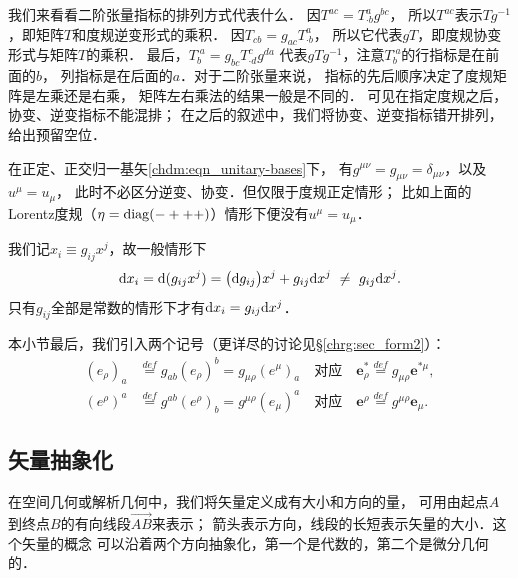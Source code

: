 我们来看看二阶张量指标的排列方式代表什么．
因$T^{ac}=T^{a}_{\cdot b}g^{bc}$，
所以$T^{ac}$表示$Tg^{-1}$，即矩阵$T$和度规逆变形式的乘积．
因$T_{cb}=g_{ac}T^{a}_{\cdot b}$，
所以它代表$g T$，即度规协变形式与矩阵$T$的乘积．
最后，$T^{\cdot a}_{b}=g_{bc}T^{c}_{\cdot d}g^{da}$
代表$g T g^{-1}$，注意$T^{\cdot a}_{b}$的行指标是在前面的$b$，
列指标是在后面的$a$．对于二阶张量来说，
指标的先后顺序决定了度规矩阵是左乘还是右乘，
矩阵左右乘法的结果一般是不同的．
可见在指定度规之后，协变、逆变指标不能混排；
在之后的叙述中，我们将协变、逆变指标错开排列，给出预留空位．

在{\kaishu 正定、正交归一}基矢\eqref{chdm:eqn_unitary-bases}下，
有$g^{\mu\nu}=g_{\mu\nu}=\delta_{\mu\nu}$，以及$u^\mu = u_\mu$，
此时不必区分逆变、协变．但仅限于度规正定情形；
比如上面的Lorentz度规（$\eta={\rm diag}(-+++)$）情形下便没有$u^\mu = u_\mu$．

我们记$x_i \equiv g_{ij}x^j$，故一般情形下
\begin{align}
	{\rm d}x_i = {\rm d}(g_{ij}x^j) = \bigl({\rm d}g_{ij}\bigr)x^j+ g_{ij}{\rm d}x^j
	\  \neq \ g_{ij}{\rm d}x^j.
\end{align}
只有$g_{ij}$全部是常数的情形下才有${\rm d}x_i =g_{ij}{\rm d}x^j$．


本小节最后，我们引入两个记号（更详尽的讨论见\S\ref{chrg:sec_form2}）：
\begin{subequations}\label{chdm:eqn_eiud}
	\begin{align}
		(e_\rho)_a &\overset{def}{=} g_{ab}(e_\rho)^b 
		= g_{\mu\rho}(e^\mu)_a
		\quad \text{对应}\quad 
		\boldsymbol{e}_\rho ^* \overset{def}{=} g_{\mu\rho} \boldsymbol{e}^{*\mu}, \\
		(e^\rho)^a &\overset{def}{=} g^{ab}(e^\rho)_b 
		= g^{\mu\rho}(e_\mu)^a 
		\quad \text{对应}\quad 
		\boldsymbol{e}^\rho \overset{def}{=} g^{\mu\rho} \boldsymbol{e}_{\mu} .
	\end{align}
\end{subequations}






\subsection{矢量抽象化}\label{chdm:sec_vector-abstract2geo}
在空间几何或解析几何中，我们将矢量定义成有大小和方向的量，
可用由起点$A$到终点$B$的有向线段$\overrightarrow{AB}$来表示；
箭头表示方向，线段的长短表示矢量的大小．这个矢量的概念
可以沿着两个方向{\kaishu 抽象化}，第一个是代数的，第二个是微分几何的．

